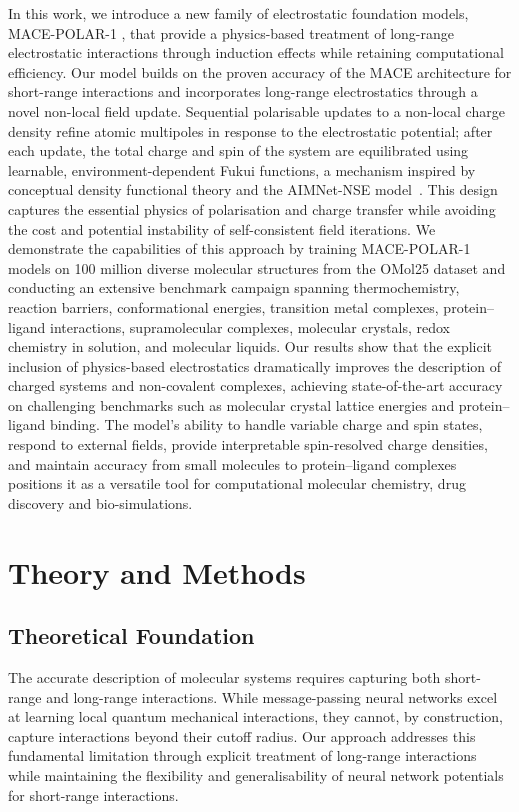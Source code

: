 \documentclass[aps,%
superscriptaddress,
 amsmath,amssymb,
floatfix,
twocolumn
]{revtex4-2}
\newcommand{\MFP}{MACE-POLAR-1 }
\begin{document}
In this work, we introduce a new family of electrostatic foundation models, \MFP, that provide a physics-based treatment of long-range electrostatic interactions through induction effects while retaining computational efficiency. Our model builds on the proven accuracy of the MACE architecture for short-range interactions and incorporates long-range electrostatics through a novel non-local field update. Sequential polarisable updates to a non-local charge density refine atomic multipoles in response to the electrostatic potential; after each update, the total charge and spin of the system are equilibrated using learnable, environment-dependent Fukui functions, a mechanism inspired by conceptual density functional theory and the AIMNet-NSE model~\cite{aimnetnse}. This design captures the essential physics of polarisation and charge transfer while avoiding the cost and potential instability of self-consistent field iterations.
We demonstrate the capabilities of this approach by training \MFP models on 100 million diverse molecular structures from the OMol25 dataset and conducting an extensive benchmark campaign spanning thermochemistry, reaction barriers, conformational energies, transition metal complexes, protein--ligand interactions, supramolecular complexes, molecular crystals, redox chemistry in solution, and molecular liquids. Our results show that the explicit inclusion of physics-based electrostatics dramatically improves the description of charged systems and non-covalent complexes, achieving state-of-the-art accuracy on challenging benchmarks such as molecular crystal lattice energies and protein--ligand binding. The model's ability to handle variable charge and spin states, respond to external fields, provide interpretable spin-resolved charge densities, and maintain accuracy from small molecules to protein--ligand complexes positions it as a versatile tool for computational molecular chemistry, drug discovery and bio-simulations.

\section{Theory and Methods}

\subsection{Theoretical Foundation}

The accurate description of molecular systems requires capturing both short-range and long-range interactions. While message-passing neural networks excel at learning local quantum mechanical interactions, they cannot, by construction, capture interactions beyond their cutoff radius. Our approach addresses this fundamental limitation through explicit treatment of long-range interactions while maintaining the flexibility and generalisability of neural network potentials for short-range interactions.
\end{document}
